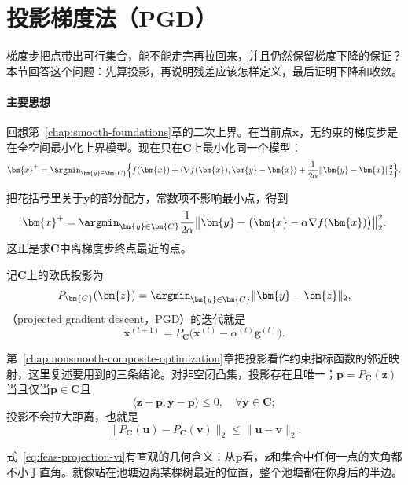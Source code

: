 \section{投影梯度法（PGD）}
\label{sec:feas-pgd}

梯度步把点带出可行集合，能不能走完再拉回来，并且仍然保留梯度下降的保证？本节回答这个问题：先算投影，再说明残差应该怎样定义，最后证明下降和收敛。

\paragraph{主要思想}
回想第~\ref{chap:smooth-foundations}章的二次上界。在当前点$\bm{x}$，无约束的梯度步是在全空间最小化上界模型。现在只在$\bm{C}$上最小化同一个模型：
\[
 \bm{x}^{+}=\argmin_{\bm{y}\in\bm{C}}\Bigl\{f(\bm{x})+\langle\nabla f(\bm{x}),\bm{y}-\bm{x}\rangle+\frac{1}{2\alpha}\lVert\bm{y}-\bm{x}\rVert_2^2\Bigr\}.
\]

把花括号里关于$\bm{y}$的部分配方，常数项不影响最小点，得到
\[
 \bm{x}^{+}=\argmin_{\bm{y}\in\bm{C}}\frac{1}{2\alpha}\bigl\lVert\bm{y}-\bigl(\bm{x}-\alpha\nabla f(\bm{x})\bigr)\bigr\rVert_2^2.
\]
这正是求$\bm{C}$中离梯度步终点最近的点。

记$\bm{C}$上的欧氏投影为
\begin{equation}
 P_{\bm{C}}(\bm{z})=\argmin_{\bm{y}\in\bm{C}}\lVert\bm{y}-\bm{z}\rVert_2,
 \label{eq:feas-projection}
\end{equation}
（projected gradient descent，PGD）的迭代就是
\begin{equation}
 \bm{x}^{(t+1)}=P_{\bm{C}}\bigl(\bm{x}^{(t)}-\alpha^{(t)}\bm{g}^{(t)}\bigr).
 \label{eq:feas-pgd}
\end{equation}

第~\ref{chap:nonsmooth-composite-optimization}章把投影看作约束指标函数的邻近映射，这里复述要用到的三条结论。对非空闭凸集，投影存在且唯一；$\bm{p}=P_{\bm{C}}(\bm{z})$当且仅当$\bm{p}\in\bm{C}$且
\begin{equation}
 \langle\bm{z}-\bm{p},\bm{y}-\bm{p}\rangle\leq0,\quad\forall\bm{y}\in\bm{C};
 \label{eq:feas-projection-vi}
\end{equation}
投影不会拉大距离，也就是
\begin{equation}
 \lVert P_{\bm{C}}(\bm{u})-P_{\bm{C}}(\bm{v})\rVert_2\leq\lVert\bm{u}-\bm{v}\rVert_2.
 \label{eq:feas-nonexpansive}
\end{equation}

式~\eqref{eq:feas-projection-vi}有直观的几何含义：从$\bm{p}$看，$\bm{z}$和集合中任何一点的夹角都不小于直角。就像站在池塘边离某棵树最近的位置，整个池塘都在你身后的半边。

